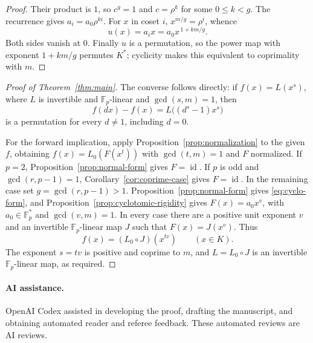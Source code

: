 \documentclass[11pt]{article}
\theoremstyle{definition}
\theoremstyle{remark}
\newcommand{\Fp}{\mathbb F_p}
\newcommand{\id}{\operatorname{id}}
\numberwithin{equation}{section}
\begin{document}
\begin{proof}
Their product is \(1\), so \(c^g=1\) and \(c=\rho^k\) for some
\(0\le k<g\). The recurrence gives \(a_i=a_0\rho^{ki}\).
For \(x\) in coset \(i\), \(x^{m/g}=\rho^i\), whence
\[
 u(x)=a_i x=a_0x^{\,1+km/g}.
\]
Both sides vanish at \(0\). Finally \(u\) is a permutation, so
the power map with exponent \(1+km/g\) permutes \(K^*\);
cyclicity makes this equivalent to coprimality with \(m\).
\end{proof}

\begin{proof}[Proof of Theorem~\ref{thm:main}]
The converse follows directly: if \(f(x)=L(x^s)\), where
\(L\) is invertible and \(\Fp\)-linear and \(\gcd(s,m)=1\), then
\[
 f(dx)-f(x)=L\bigl((d^s-1)x^s\bigr)
\]
is a permutation for every \(d\ne1\), including \(d=0\).

For the forward implication, apply
Proposition~\ref{prop:normalization} to the given \(f\), obtaining
\(f(x)=L_0(F(x^t))\) with \(\gcd(t,m)=1\) and \(F\) normalized.
If \(p=2\), Proposition~\ref{prop:normal-form} gives \(F=\id\).
If \(p\) is odd and \(\gcd(r,p-1)=1\),
Corollary~\ref{cor:coprime-case} gives \(F=\id\).
In the remaining case set \(g=\gcd(r,p-1)>1\).
Proposition~\ref{prop:normal-form} gives \eqref{eq:cyclo-form},
and Proposition~\ref{prop:cyclotomic-rigidity} gives
\(F(x)=a_0x^v\), with \(a_0\in\Fp^*\) and \(\gcd(v,m)=1\).
In every case there are a positive unit exponent \(v\) and an
invertible \(\Fp\)-linear map \(J\) such that \(F(x)=J(x^v)\).
Thus
\[
 f(x)=(L_0\circ J)(x^{tv})\qquad(x\in K).
\]
The exponent \(s=tv\) is positive and coprime to \(m\), and
\(L=L_0\circ J\) is an invertible \(\Fp\)-linear map, as required.
\end{proof}

\paragraph{AI assistance.}
OpenAI Codex assisted in developing the proof, drafting the manuscript,
and obtaining automated reader and referee feedback. These automated
reviews are AI reviews.
\end{document}
